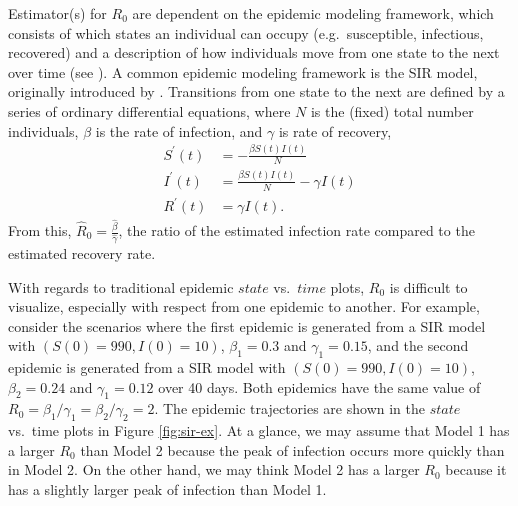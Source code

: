 \documentclass[
  shortnames]{jss}
\begin{document}
Estimator(s) for \(R_0\) are dependent on the epidemic modeling
framework, which consists of which states an individual can occupy
(e.g.~susceptible, infectious, recovered) and a description of how
individuals move from one state to the next over time (see
\cite{hethcote1994}). A common epidemic modeling framework is the SIR
model, originally introduced by \citet{kermack1927}. Transitions from
one state to the next are defined by a series of ordinary differential
equations, where \(N\) is the (fixed) total number individuals,
\(\beta\) is the rate of infection, and \(\gamma\) is rate of recovery,
\begin{align}\label{eq:sir-ode}
      S^\prime(t) &= -\frac{\beta S(t)I(t)}{N} \\
      I^\prime(t) &= \frac{\beta S(t)I(t)}{N} - \gamma I(t) \nonumber\\
      R^\prime(t) &= \gamma I(t) \nonumber.
  \end{align} From this,
\(\hat{R}_0 = \frac{\hat{\beta}}{\hat{\gamma}}\), the ratio of the
estimated infection rate compared to the estimated recovery rate.

With regards to traditional epidemic \(state\) vs.~\(time\) plots,
\(R_0\) is difficult to visualize, especially with respect from one
epidemic to another. For example, consider the scenarios where the first
epidemic is generated from a SIR model with \((S(0) = 990, I(0) = 10)\),
\(\beta_1 = 0.3\) and \(\gamma_1 = 0.15\), and the second epidemic is
generated from a SIR model with \((S(0) = 990, I(0) = 10)\),
\(\beta_2 = 0.24\) and \(\gamma_1 = 0.12\) over 40 days. Both epidemics
have the same value of
\(R_0 = \beta_1/ \gamma_1 = \beta_2 / \gamma_2 = 2\). The epidemic
trajectories are shown in the \(state\) vs.~time plots in Figure
\ref{fig:sir-ex}. At a glance, we may assume that Model 1 has a larger
\(R_0\) than Model 2 because the peak of infection occurs more quickly
than in Model 2. On the other hand, we may think Model 2 has a larger
\(R_0\) because it has a slightly larger peak of infection than Model 1.
\end{document}
